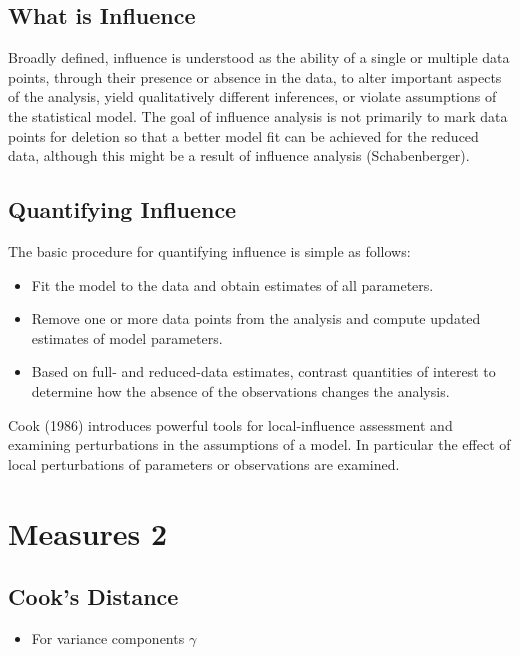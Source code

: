 \documentclass[Main.tex]{subfiles}
\begin{document}
	
	\subsection{What is Influence} %
	
	Broadly defined, influence is understood as the ability of a single or multiple data points, through their presence or absence in the data, to alter important aspects of the analysis, yield qualitatively different inferences, or violate assumptions of the statistical model. The goal of influence analysis is not primarily to mark data
	points for deletion so that a better model fit can be achieved for the reduced data, although this might be a result of influence analysis (Schabenberger).
	
	\subsection{Quantifying Influence}  %
	
	The basic procedure for quantifying influence is simple as follows:
	
	\begin{itemize}
		\item Fit the model to the data and obtain estimates of all parameters.
		\item Remove one or more data points from the analysis and compute updated estimates of model parameters.
		\item Based on full- and reduced-data estimates, contrast quantities of interest to determine how the absence of the observations changes the analysis.
	\end{itemize}
	
	Cook (1986) introduces powerful tools for local-influence assessment and examining perturbations in the assumptions of a model. In particular the effect of local perturbations of parameters or observations are examined.
	
	
	\newpage
	\section{Measures 2} %
	
	
	\subsection{Cook's Distance} %
	\begin{itemize}
		\item For variance components $\gamma$
	\end{itemize}
	
\end{document}
